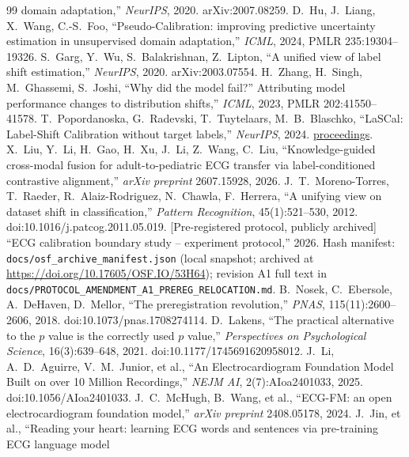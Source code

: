 \documentclass[review,12pt,nonatbib]{elsarticle}
\begin{document}
\begin{thebibliography}{99}
domain adaptation,'' \emph{NeurIPS}, 2020. arXiv:2007.08259.
 D.~Hu, J.~Liang, X.~Wang, C.-S.~Foo,
``Pseudo-Calibration: improving predictive uncertainty estimation in
unsupervised domain adaptation,'' \emph{ICML}, 2024,
PMLR 235:19304--19326.
 S.~Garg, Y.~Wu, S.~Balakrishnan,
Z.~Lipton, ``A unified view of label shift estimation,''
\emph{NeurIPS}, 2020. arXiv:2003.07554.
 H.~Zhang, H.~Singh, M.~Ghassemi, S.~Joshi,
``Why did the model fail?'' Attributing model performance changes to
distribution shifts,'' \emph{ICML}, 2023, PMLR 202:41550--41578.
 T.~Popordanoska, G.~Radevski, T.~Tuytelaars,
M.~B.~Blaschko, ``LaSCal: Label-Shift Calibration without target
labels,'' \emph{NeurIPS}, 2024.
\href{https://proceedings.neurips.cc/paper_files/paper/2024/hash/783c5986e1d6112cb4688d9b2105609a-Abstract-Conference.html}{proceedings}.
 X.~Liu, Y.~Li, H.~Gao, H.~Xu, J.~Li, Z.~Wang,
C.~Liu, ``Knowledge-guided cross-modal fusion for adult-to-pediatric
ECG transfer via label-conditioned contrastive alignment,''
\emph{arXiv preprint} 2607.15928, 2026.
 J.~T.~Moreno-Torres, T.~Raeder,
R.~Alaiz-Rodriguez, N.~Chawla, F.~Herrera, ``A unifying view on
dataset shift in classification,'' \emph{Pattern Recognition},
45(1):521--530, 2012. doi:10.1016/j.patcog.2011.05.019.
 [Pre-registered protocol, publicly archived] ``ECG
calibration boundary study -- experiment protocol,'' 2026. Hash manifest:
\texttt{docs/osf\_archive\_manifest.json} (local snapshot; archived at
\url{https://doi.org/10.17605/OSF.IO/53H64}); revision A1 full text in
\texttt{docs/PROTOCOL\_AMENDMENT\_A1\_PREREG\_RELOCATION.md}.
 B.~Nosek, C.~Ebersole, A.~DeHaven,
D.~Mellor, ``The preregistration revolution,'' \emph{PNAS},
115(11):2600--2606, 2018. doi:10.1073/pnas.1708274114.
 D.~Lakens, ``The practical alternative to
the $p$ value is the correctly used $p$ value,''
\emph{Perspectives on Psychological Science}, 16(3):639--648, 2021.
doi:10.1177/1745691620958012.
 J.~Li, A.~D.~Aguirre, V.~M.~Junior, et al.,
``An Electrocardiogram Foundation Model Built on over 10 Million
Recordings,'' \emph{NEJM AI},
2(7):AIoa2401033, 2025. doi:10.1056/AIoa2401033.
 J.~C.~McHugh, B.~Wang, et al., ``ECG-FM: an open
electrocardiogram foundation model,'' \emph{arXiv preprint}
2408.05178, 2024.
 J.~Jin, et al., ``Reading your heart: learning
ECG words and sentences via pre-training ECG language model

\end{thebibliography}
\end{document}
